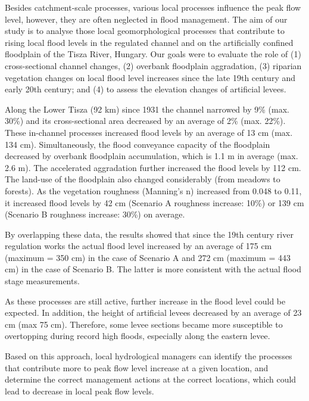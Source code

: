 {Besides catchment-scale processes, various local processes influence the peak flow level, however, they are often neglected in flood management. The aim of our study is to analyse those local geomorphological processes that contribute to rising local flood levels in the regulated channel and on the artificially confined floodplain of the Tisza River, Hungary. Our goals were to evaluate the role of (1) cross-sectional channel changes, (2) overbank floodplain aggradation, (3) riparian vegetation changes on local flood level increases since the late 19th century and early 20th century; and (4) to assess the elevation changes of artificial levees. 
	
Along the Lower Tisza (92 km) since 1931 the channel narrowed by 9\% (max. 30\%) and its cross-sectional area decreased by an average of 2\% (max. 22\%). These in-channel processes increased flood levels by an average of 13 cm (max. 134 cm). Simultaneously, the flood conveyance capacity of the floodplain decreased by overbank floodplain accumulation, which is 1.1 m in average (max. 2.6 m). The accelerated aggradation further increased the flood levels by 112 cm. The land-use of the floodplain also changed considerably (from meadows to forests). As the vegetation roughness (Manning’s n) increased from 0.048 to 0.11, it increased flood levels by 42 cm (Scenario A roughness increase: 10\%) or 139 cm (Scenario B roughness increase: 30\%) on average.

By overlapping these data, the results showed that since the 19th century river regulation works the actual flood level increased by an average of 175 cm (maximum = 350 cm) in the case of Scenario A and 272 cm (maximum = 443 cm) in the case of Scenario B. The latter is more consistent with the actual flood stage measurements. 

As these processes are still active, further increase in the flood level could be expected. In addition, the height of artificial levees decreased by an average of 23 cm (max 75 cm). Therefore, some levee sections became more susceptible to overtopping during record high floods, especially along the eastern levee. 

Based on this approach, local hydrological managers can identify the processes that contribute more to peak flow level increase at a given location, and determine the correct management actions at the correct locations, which could lead to decrease in local peak flow levels.
}
{
}

